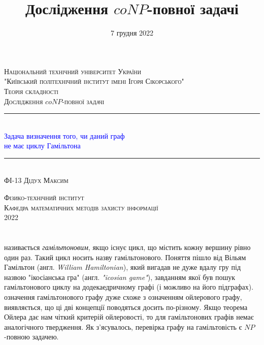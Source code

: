 \documentclass[14pt]{article}
\begin{document}
\begin{spacing}{1.175}	
	\begin{titlepage} 
		\newcommand{\HRule}{\rule{\linewidth}{0.3mm}}
		\center 
		
		\textsc{\large Національний технічний університет України
			\\"Київський політехнічний інститут імені Ігоря Сікорського"}\\[1.5cm]
		
		\vspace{5cm}
		\textsc{\large Теорія складності}\\[0.5cm]
		
		\textsc{\large Дослідження \(coNP\)-повної задачі}\\[0.5cm] 
		
		\HRule\\[0.4cm]
		
		{\huge \textcolor{blue}{Задача визначення того, чи даний граф\\
            не має циклу Гамільтона}}\\[0.4cm]
		
		\HRule\\[1.5cm]
		\textsc{\large ФІ-13 Дідух Максим}\\[0.5cm]
		
		\vspace{7.5cm}
		
		\textsc{\large Фізико-технічний інститут}\\[0.5cm]
		\textsc{\large Кафедра математичних методів захисту інформації}\\[0.5cm]
		{\large {2022}} 
	\end{titlepage}
    
    \newpage
    \title{\Large Дослідження \(coNP\)-повної задачі}
    \date{\large 7 грудня 2022}
    \maketitle
    \tableofcontents                                                                            %
    \newpage
    \section{}
 називається \textit{гамільтоновим}, якщо існує цикл, що містить кожну вершину рівно один раз. Такий цикл носить назву гамільтонового.
Поняття пішло від Вільям Гамільтон (англ. \textit{William Hamiltonian}), який вигадав не дуже вдалу гру під назвою "ікосіанська гра" (англ. \textit{"icosian game"}), завданням якої був пошук гамільтонового циклу на додекаедричному графі (і можливо на його підграфах).
 означення гамільтонового графу дуже схоже з означенням ойлерового графу, виявляється, що ці дві концепції поводяться досить по-різному. Якщо теорема Ойлера дає нам чіткий критерій ойлеровості, то для гамільтонових графів немає аналогічного твердження. Як з'ясувалось, перевірка графу на гамільтовість є \(NP\)-повною задачею.

\end{spacing}
\end{document}
